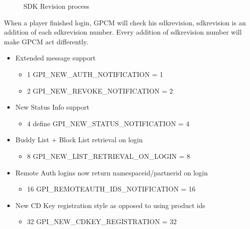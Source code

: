 \documentclass[oneside,titlepage,a4paper]{Definition/retrospy} %
\begin{document}
\begin{figure}[H]
	\centering
	\caption{SDK Revision process}
	\label{SDK Revision process}
\end{figure}
	When a player finished login, GPCM will check his sdkrevision, sdkrevision is an addition of each sdkrevision number. Every addition of sdkrevision number will make GPCM act differently.
\begin{tcolorbox}
	\begin{itemize}
		\item Extended message support
		\begin{itemize}
			\item{1} GPI\_NEW\_AUTH\_NOTIFICATION = 1
			\item{2} GPI\_NEW\_REVOKE\_NOTIFICATION = 2
		\end{itemize}
		
		\item New Status Info support
		\begin{itemize}
			\item{4} define GPI\_NEW\_STATUS\_NOTIFICATION = 4
		\end{itemize}
		
		\item Buddy List + Block List retrieval on login
		\begin{itemize}
			\item{8} GPI\_NEW\_LIST\_RETRIEVAL\_ON\_LOGIN = 8
		\end{itemize}
	\item Remote Auth logins now return namespaceid/partnerid on login
	\begin{itemize}
		\item{16} GPI\_REMOTEAUTH\_IDS\_NOTIFICATION = 16
	\end{itemize}

	\item New CD Key registration style as opposed to using product ids
	\begin{itemize}
		\item{32}  GPI\_NEW\_CDKEY\_REGISTRATION = 32
	\end{itemize}

	\end{itemize}
\end{tcolorbox}
\end{document}
